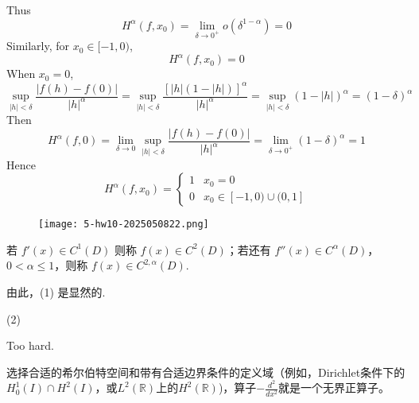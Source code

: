 Thus
\[
H^{\alpha}(f,x_0)=\lim_{ \delta \to 0^{+} } o(\delta^{1-\alpha})=0
\]
Similarly, for $x_0\in[-1,0)$,
\[
H^{\alpha}(f,x_0)=0
\]
When $x_0=0$,
\[
\sup_{\lvert h \rvert <\delta}\frac{\lvert f(h)-f(0) \rvert }{\lvert h \rvert ^{\alpha}}=\sup_{\lvert h \rvert <\delta}\frac{[\lvert h \rvert (1-\lvert h \rvert )]^{\alpha}}{\lvert h \rvert ^{\alpha}}=\sup_{\lvert h \rvert <\delta}(1-\lvert h \rvert )^{\alpha}=(1-\delta)^{\alpha}
\]
Then
\[
H^{\alpha}(f,0)=\lim_{ \delta \to 0 } \sup_{\lvert h \rvert <\delta}\frac{\lvert f(h)-f(0) \rvert }{\lvert h \rvert ^{\alpha}}=\lim_{ \delta \to 0^{+} }(1-\delta)^{\alpha}=1
\]
Hence
\[
H^{\alpha}(f,x_0)=\begin{cases}
1 & x_0=0  \\
0 & x_0\in[-1,0)\cup(0,1]
\end{cases}
\]
\begin{exercise}
\begin{figure}[H]
\centering
\texttt{[image: 5-hw10-2025050822.png]}
\label{}
\end{figure}
\end{exercise}
若 $f' (x)\in C^{1}(D)$ 则称 $f (x)\in C^2(D)$；若还有 $f'' (x)\in C^{\alpha}(D)$，$0<\alpha\leq1$，则称 $f (x)\in C^{2,\alpha}(D)$.

由此，(1) 是显然的.

(2)

\begin{note}
Too hard.
\end{note}
选择合适的希尔伯特空间和带有合适边界条件的定义域（例如，Dirichlet条件下的$H_0^1(I) \cap H^2(I)$，或$L^2(\mathbb{R})$上的$H^2(\mathbb{R})$)，算子$-\frac{d^2}{dx^2}$就是一个无界正算子。
